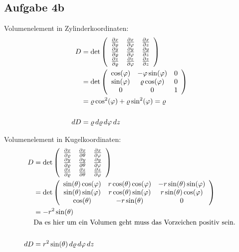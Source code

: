 \documentclass[a4paper,10pt]{extarticle}
\begin{document}
  \subsection*{Aufgabe 4b}
  Volumenelement in Zylinderkoordinaten:
  \begin{align*}
  D &= \det \left(\begin{array}{c c c}
    \pdv{x}{\varrho} & \pdv{x}{\varphi} & \pdv{x}{z} \\
    \pdv{y}{\varrho} & \pdv{y}{\varphi} & \pdv{y}{z} \\
    \pdv{z}{\varrho} & \pdv{z}{\varphi} & \pdv{z}{z} \\
  \end{array}\right) \\
  &= \det \left(\begin{array}{c c c}
    \cos(\varphi) & -\varphi \sin(\varphi) & 0 \\
    \sin(\varphi) & \varrho \cos(\varphi) & 0 \\
    0 & 0 & 1 \\
  \end{array}\right) \\
  &= \varrho \cos^2(\varphi) + \varrho \sin^2(\varphi) = \varrho \\ \\
  dD &= \varrho \,d\varrho \, d\varphi \, dz
  \end{align*}

  Volumenelement in Kugelkoordinaten:
  \begin{align*}
  D &= \det \left(\begin{array}{c c c}
    \pdv{x}{\varrho} & \pdv{x}{\theta} & \pdv{x}{\varphi} \\
    \pdv{y}{\varrho} & \pdv{y}{\theta} & \pdv{y}{\varphi} \\
    \pdv{z}{\varrho} & \pdv{z}{\theta} & \pdv{z}{\varphi} \\
  \end{array}\right) \\
  &= \det \left(\begin{array}{c c c}
    \sin(\theta)\cos(\varphi) & r \cos(\theta) \cos(\varphi) & -r\sin(\theta) \sin(\varphi) \\
    \sin(\theta) \sin(\varphi) & r \cos(\theta) \sin(\varphi) & r \sin(\theta) \cos(\varphi) \\
    \cos(\theta) & -r\sin(\theta) & 0 \\
  \end{array}\right) \\
  &= -r^2 \sin(\theta) \\
  &\mbox{Da es hier um ein Volumen geht muss das Vorzeichen positiv sein.} \\ \\
  dD &= r^2 \sin(\theta) \,d\varrho \, d\varphi \, dz
  \end{align*}
\end{document}
